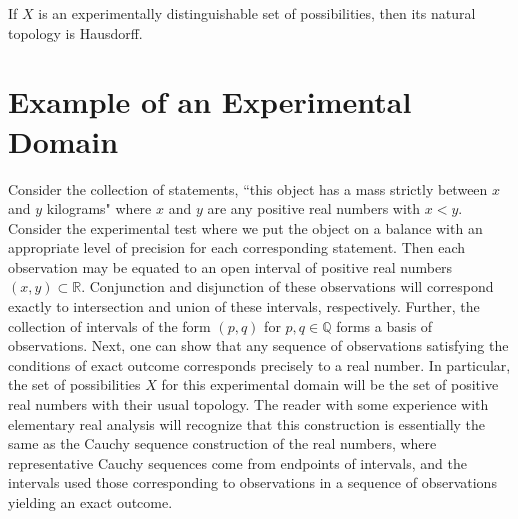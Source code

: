 \documentclass[11pt,letterpaper,fleqn]{memoir} %
\begin{document}
\begin{mathSection}

\begin{prop}
	If $X$ is an experimentally distinguishable set of possibilities, then its natural topology is Hausdorff.
\end{prop}


	
\end{mathSection}


\section{Example of an Experimental Domain}

Consider the collection of statements, ``this object has a mass strictly between $x$ and $y$ kilograms" where $x$ and $y$ are any positive real numbers with $x<y$. Consider the experimental test where we put the object on a balance with an appropriate level of precision for each corresponding statement. Then each observation may be equated to an open interval of positive real numbers $(x,y)\subset\mathbb{R}$. Conjunction and disjunction of these observations will correspond exactly to intersection and union of these intervals, respectively. Further, the collection of intervals of the form $(p,q)$ for $p,q\in\mathbb{Q}$ forms a basis of observations. Next, one can show that any sequence of observations satisfying the conditions of exact outcome corresponds precisely to a real number. In particular, the set of possibilities $X$ for this experimental domain will be the set of positive real numbers with their usual topology. The reader with some experience with elementary real analysis will recognize that this construction is essentially the same as the Cauchy sequence construction of the real numbers, where representative Cauchy sequences come from endpoints of intervals, and the intervals used those corresponding to observations in a sequence of observations yielding an exact outcome. 
\end{document}
